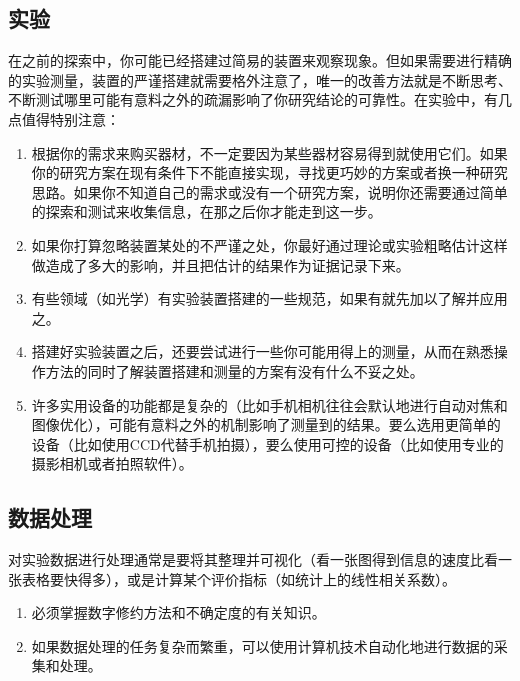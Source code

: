 \documentclass[a4paper,10pt,english]{sphinxmanual}
\begin{document}
\subsection{实验}
\label{\detokenize{5. Research:id6}}
在之前的探索中，你可能已经搭建过简易的装置来观察现象。但如果需要进行精确的实验测量，装置的严谨搭建就需要格外注意了，唯一的改善方法就是不断思考、不断测试哪里可能有意料之外的疏漏影响了你研究结论的可靠性。在实验中，有几点值得特别注意：
\begin{enumerate}
\item {} 
根据你的需求来购买器材，不一定要因为某些器材容易得到就使用它们。如果你的研究方案在现有条件下不能直接实现，寻找更巧妙的方案或者换一种研究思路。如果你不知道自己的需求或没有一个研究方案，说明你还需要通过简单的探索和测试来收集信息，在那之后你才能走到这一步。

\item {} 
如果你打算忽略装置某处的不严谨之处，你最好通过理论或实验粗略估计这样做造成了多大的影响，并且把估计的结果作为证据记录下来。

\item {} 
有些领域（如光学）有实验装置搭建的一些规范，如果有就先加以了解并应用之。

\item {} 
搭建好实验装置之后，还要尝试进行一些你可能用得上的测量，从而在熟悉操作方法的同时了解装置搭建和测量的方案有没有什么不妥之处。

\item {} 
许多实用设备的功能都是复杂的（比如手机相机往往会默认地进行自动对焦和图像优化），可能有意料之外的机制影响了测量到的结果。要么选用更简单的设备（比如使用CCD代替手机拍摄），要么使用可控的设备（比如使用专业的摄影相机或者拍照软件）。

\end{enumerate}


\subsection{数据处理}
\label{\detokenize{5. Research:id7}}
对实验数据进行处理通常是要将其整理并可视化（看一张图得到信息的速度比看一张表格要快得多），或是计算某个评价指标（如统计上的线性相关系数）。
\begin{enumerate}
\item {} 
必须掌握数字修约方法和不确定度的有关知识。

\item {} 
如果数据处理的任务复杂而繁重，可以使用计算机技术自动化地进行数据的采集和处理。

\end{enumerate}
\end{document}
